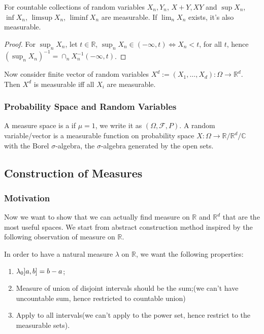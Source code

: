 \begin{thm}[Measurability]
    For countable collections of random variables \(X_{n}, Y_{n}\), \(X +Y, XY\) and \(\sup X_{n}\), \( \inf X_{n}\), \( \limsup X_{n}\), \( \liminf X_{n}\) are measurable. If \(\lim_{n} X_{n}\) exists, it's also measurable.
\end{thm}

\begin{proof}
    For \(\sup_{n} X_{n}\), let \(t \in \mathbb{R}\), \(\sup_{n} X_{n} \in (-\infty, t) \iff X_{n} < t\), for all \(t\), hence \((\sup_{n} X_{n})^{-1} = \cap_{n} X_{n} ^{-1} (- \infty, t)\).    
\end{proof}
Now consider finite vector of random variables \(X^{d} := (X_{1}, \dots,X_{d}) : \Omega \to \mathbb{R}^{d}\). Then \(X^{d}\) is measurable iff all \(X_{i}\) are measurable. 

\subsubsection{Probability Space and Random Variables}

A measure space is a  if \(\mu =1\), we write it as \((\Omega, \mathcal{F}, P)\). A random variable/vector is a measurable function on probability space \(X: \Omega \to \mathbb{R}/\mathbb{R}^{d}/\mathbb{C}\) with the Borel \(\sigma\)-algebra, the \(\sigma\)-algebra generated by the open sets.

\subsection{Construction of Measures}

\subsubsection{Motivation}
Now we want to show that we can actually find measure on \(\mathbb{R}\) and \(\mathbb{R}^{d}\) that are the most useful spaces. We start from abstract construction method inspired by the following observation of measure on \(\mathbb{R}\).

In order to have a natural measure \(\lambda\) on \(\mathbb{R}\), we want the following properties:
\begin{enumerate}
    \item \(\lambda_{0} \linterval{a}{b} = b - a \);
    \item Measure of union of disjoint intervals should be the sum;(we can't have uncountable sum, hence restricted to countable union)
    \item Apply to all intervals(we can't apply to the power set, hence restrict to the measurable sets).
\end{enumerate}

